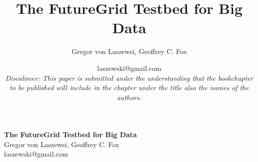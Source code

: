\documentclass{article}
\makeatletter
\newcommand{\TITLE}{The FutureGrid Testbed for Big Data}
\newcommand{\AUTHOR}{Gregor von Laszewsi, Geoffrey C. Fox}
\newcommand{\EMAIL}{laszewski@gmail.com}
\makeatother
\begin{document}
\title{\TITLE}
\author{\AUTHOR}
\date{\EMAIL \\
{\em\footnotsize Discalimer: This paper is submitted under the understanding that the bookchapter to be published will include in the chapter under the title also the names of the authors.} 
}








\begin{center}
{\Large\bf \TITLE}\\
{\AUTHOR}\\
{\EMAIL}
\end{center}


\tableofcontents


\newpage




\listoftodos


\newpage






\maketitle


\end{document}
